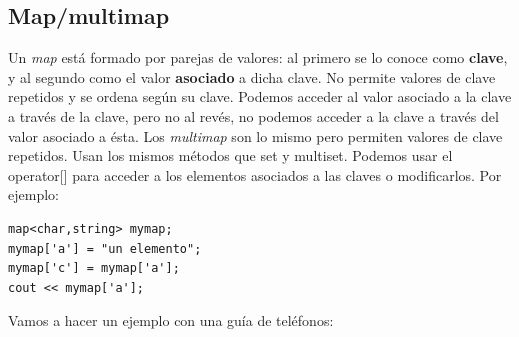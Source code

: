 \documentclass[10pt,a4paper,spanish]{report}
\begin{document}
\subsection{\textcolor[rgb]{0.2,0.5,0.5}Map/multimap}
\noindent
Un \textit{\textcolor[rgb]{0.2,0.5,0.5}{map}} está formado por parejas de valores: al primero se lo conoce como 
\textbf{\textcolor[rgb]{0.2,0.5,0.5}{clave}}, y al segundo como el valor \textbf{\textcolor[rgb]{0.2,0.5,0.5}{asociado}} 
a dicha clave. No permite valores de clave repetidos y se ordena según su clave. Podemos acceder al valor asociado a la clave 
a través de la clave, pero no al revés, no podemos acceder a la clave a través del valor asociado a ésta.
Los \textit{\textcolor[rgb]{0.2,0.5,0.5}{multimap}} son lo mismo pero permiten valores de clave repetidos. Usan los mismos métodos que set y multiset. Podemos usar el operator[] para acceder a los elementos asociados a las claves o modificarlos. Por ejemplo:
\begin{verbatim}
map<char,string> mymap;
mymap['a'] = "un elemento";
mymap['c'] = mymap['a'];
cout << mymap['a'];
\end{verbatim}

\noindent
Vamos a hacer un ejemplo con una guía de teléfonos:
\end{document}
